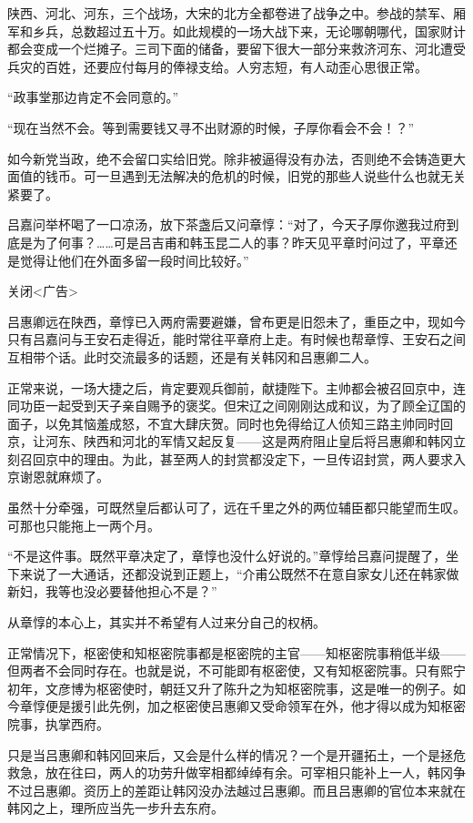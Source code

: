 陕西、河北、河东，三个战场，大宋的北方全都卷进了战争之中。参战的禁军、厢军和乡兵，总数超过五十万。如此规模的一场大战下来，无论哪朝哪代，国家财计都会变成一个烂摊子。三司下面的储备，要留下很大一部分来救济河东、河北遭受兵灾的百姓，还要应付每月的俸禄支给。人穷志短，有人动歪心思很正常。

“政事堂那边肯定不会同意的。”

“现在当然不会。等到需要钱又寻不出财源的时候，子厚你看会不会！？”

如今新党当政，绝不会留口实给旧党。除非被逼得没有办法，否则绝不会铸造更大面值的钱币。可一旦遇到无法解决的危机的时候，旧党的那些人说些什么也就无关紧要了。

吕嘉问举杯喝了一口凉汤，放下茶盏后又问章惇：“对了，今天子厚你邀我过府到底是为了何事？……可是吕吉甫和韩玉昆二人的事？昨天见平章时问过了，平章还是觉得让他们在外面多留一段时间比较好。”

关闭<广告>

吕惠卿远在陕西，章惇已入两府需要避嫌，曾布更是旧怨未了，重臣之中，现如今只有吕嘉问与王安石走得近，能时常往平章府上走。有时候也帮章惇、王安石之间互相带个话。此时交流最多的话题，还是有关韩冈和吕惠卿二人。

正常来说，一场大捷之后，肯定要观兵御前，献捷陛下。主帅都会被召回京中，连同功臣一起受到天子亲自赐予的褒奖。但宋辽之间刚刚达成和议，为了顾全辽国的面子，以免其恼羞成怒，不宜大肆庆贺。同时也免得给辽人侦知三路主帅同时回京，让河东、陕西和河北的军情又起反复——这是两府阻止皇后将吕惠卿和韩冈立刻召回京中的理由。为此，甚至两人的封赏都没定下，一旦传诏封赏，两人要求入京谢恩就麻烦了。

虽然十分牵强，可既然皇后都认可了，远在千里之外的两位辅臣都只能望而生叹。可那也只能拖上一两个月。

“不是这件事。既然平章决定了，章惇也没什么好说的。”章惇给吕嘉问提醒了，坐下来说了一大通话，还都没说到正题上，“介甫公既然不在意自家女儿还在韩家做新妇，我等也没必要替他担心不是？”

从章惇的本心上，其实并不希望有人过来分自己的权柄。

正常情况下，枢密使和知枢密院事都是枢密院的主官——知枢密院事稍低半级——但两者不会同时存在。也就是说，不可能即有枢密使，又有知枢密院事。只有熙宁初年，文彦博为枢密使时，朝廷又升了陈升之为知枢密院事，这是唯一的例子。如今章惇便是援引此先例，加之枢密使吕惠卿又受命领军在外，他才得以成为知枢密院事，执掌西府。

只是当吕惠卿和韩冈回来后，又会是什么样的情况？一个是开疆拓土，一个是拯危救急，放在往曰，两人的功劳升做宰相都绰绰有余。可宰相只能补上一人，韩冈争不过吕惠卿。资历上的差距让韩冈没办法越过吕惠卿。而且吕惠卿的官位本来就在韩冈之上，理所应当先一步升去东府。

